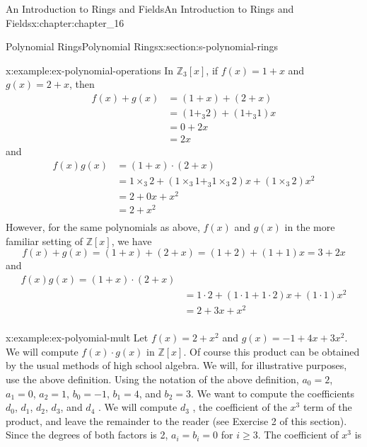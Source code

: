 \documentclass[oneside,10pt,]{book}
\numberwithin{equation}{section}
\begin{document}
\begin{chapterptx}{An Introduction to Rings and Fields}{}{An Introduction to Rings and Fields}{}{}{x:chapter:chapter_16}
\begin{sectionptx}{Polynomial Rings}{}{Polynomial Rings}{}{}{x:section:s-polynomial-rings}
\begin{example}{}{x:example:ex-polynomial-operations}%
In \(\mathbb{Z}_3[x]\), if \(f(x) = 1+x\) and  \(g(x) = 2+x\), then%
\begin{equation*}
\begin{split}
f(x) + g(x) &= (1+x) + (2+x)\\
& = \left(1 +_3 2\right)+ \left(1 +_3 1\right) x\\
&  = 0 + 2x  \\
& = 2x
\end{split}
\end{equation*}
and%
\begin{equation*}
\begin{split}
f(x)g(x) &= (1+x) \cdot  (2 +x) \\
&= 1\times_3 2+ (1 \times_3 1 +_3 1 \times_3 2)x +  (1 \times_3 2)x^2\\
& =2 + 0 x + x^2\\
& =2 +  x^2\\
\end{split}
\end{equation*}
However, for the same polynomials as above, \(f(x)\) and \(g(x)\) in the more familiar setting of \(\mathbb{Z}[x]\), we have%
\begin{equation*}
f(x) + g(x) = (1+x) + (2+x)  = (1 +2)+ (1 +1) x = 3 + 2x
\end{equation*}
and%
\begin{equation*}
\begin{split}f(x)g(x) =(1+x)\cdot(2 +x)\\
& = 1\cdot 2+ (1 \cdot 1 +  1 \cdot 2)x + (1 \cdot 1)x^2\\
& = 2 +3x + x^2\\
\end{split}
\end{equation*}
%
\end{example}
\begin{example}{}{x:example:ex-polyomial-mult}%
Let \(f(x) = 2 + x^2\) and \(g(x) = -1 + 4x + 3x^2\). We will compute \(f(x) \cdot  g(x)\) in \(\mathbb{Z}[x]\). Of course this product can be obtained by the usual methods of high school algebra. We will, for illustrative purposes, use the above definition. Using the notation of the above definition, \(a_0=2\), \(a_1=0\), \(a_2=1\), \(b_0=-1\), \(b_1= 4\), and \(b_2 = 3\). We want to compute the coefficients \(d_0\), \(d_1\), \(d_2\), \(d_3\), and \(d_4\) . We will compute \(d_3\) , the coefficient of the \(x^3\) term of the product, and leave the remainder to the reader (see Exercise 2 of this section).  Since the degrees of both factors is 2, \(a_i= b_i= 0\)  for \(i\geq 3\).  The coefficient of \(x^3\) is%

\end{example}
\end{sectionptx}
\end{chapterptx}
\end{document}
